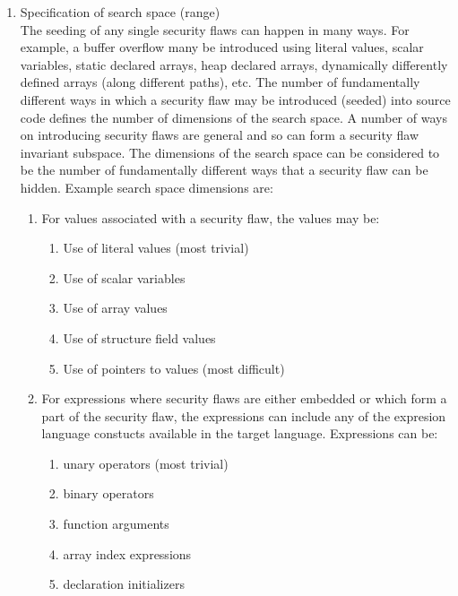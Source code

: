 \begin{enumerate}
   \item Specification of search space (range) \\
         The seeding of any single security flaws can happen in many ways.  For example,
         a buffer overflow many be introduced using literal values, scalar variables,
         static declared arrays, heap declared arrays, dynamically differently
         defined arrays (along different paths), etc.  The number of fundamentally
         different ways in which a security flaw may be introduced (seeded) into source
         code defines the number of dimensions of the search space.  A number of
         ways on introducing security flaws are general and so can form a 
         security flaw invariant subspace. The dimensions of the search space can be
         considered to be the number of fundamentally different ways that a security flaw
         can be hidden.  
         Example search space dimensions are:
         \begin{enumerate}
            \item For values associated with a security flaw, the values may be:
               \begin{enumerate}
                  \item Use of literal values (most trivial)
                  \item Use of scalar variables 
                  \item Use of array values
                  \item Use of structure field values
                  \item Use of pointers to values (most difficult)
               \end{enumerate}

            \item For expressions where security flaws are either embedded or 
                  which form a part of the security flaw, the expressions can 
                  include any of the expresion language constucts available
                  in the target language. Expressions can be:
               \begin{enumerate}
                  \item unary operators (most trivial)
                  \item binary operators
                  \item function arguments
                  \item array index expressions
                  \item declaration initializers
               \end{enumerate}


\end{enumerate}
\end{enumerate}
